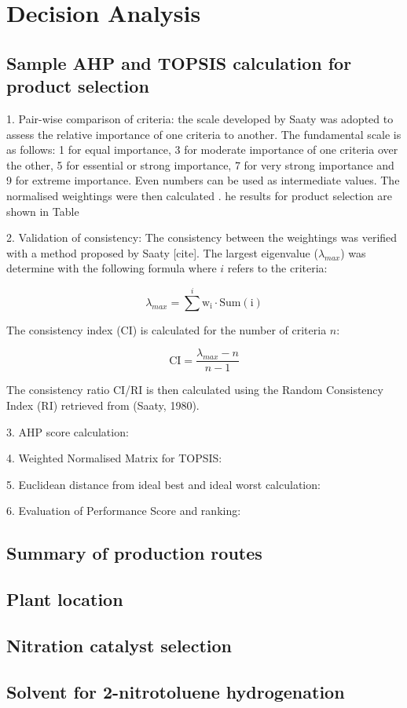 \section{Decision Analysis}
\label{app:matrix}

\subsection{Sample AHP and TOPSIS calculation for product selection}

1. Pair-wise comparison of criteria: the scale developed by Saaty was adopted to assess the relative importance of one criteria to another. The fundamental scale is as follows: 1 for equal importance, 3 for moderate importance of one criteria over the other, 5 for essential or strong importance, 7 for very strong importance and 9 for extreme importance. Even numbers can be used as intermediate values. The normalised weightings were then calculated . he results for product selection are shown in Table


2. Validation of consistency: The consistency between the weightings was verified with a method proposed by Saaty [cite]. The largest eigenvalue ($\lambda_{max}$) was determine with the following formula where $i$ refers to the criteria:

\begin{equation}
    \lambda_{max}=\sum^{i} \mathrm{w_{i}}\cdot \mathrm{Sum(i)}
\end{equation}

The consistency index (CI) is calculated for the number of criteria $n$:

\begin{equation}
   \mathrm{CI} = \frac{\lambda_{max}-n}{n-1}
\end{equation}

The consistency ratio CI/RI is then calculated using the Random Consistency Index (RI) retrieved from (Saaty, 1980). 

3. AHP score calculation:

4. Weighted Normalised Matrix for TOPSIS:

5. Euclidean distance from ideal best and ideal worst calculation:

6. Evaluation of Performance Score and ranking:

\subsection{Summary of production routes}

\subsection{Plant location}

\subsection{Nitration catalyst selection}

\subsection{Solvent for 2-nitrotoluene hydrogenation}

